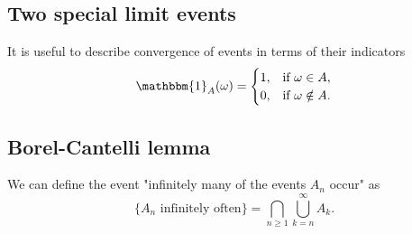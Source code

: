 \documentclass[10pt, a4paper]{article}
\begin{document}
\subsection{Two special limit events}
It is useful to describe convergence of events in terms of their indicators
\[
\mathbbm{1}_{A}(\omega) = \begin{cases}
    1, &\text{if }\omega \in A, \\
    0, &\text{if }\omega \notin A.
\end{cases}
\]

\subsection{Borel-Cantelli lemma}

We can define the event
"infinitely many of the events $A_n$ occur"
as
\[
\{A_n\text{ infinitely often}\} = \bigcap_{n \geq 1}\bigcup_{k = n}^{\infty}A_k.
\]
\end{document}

